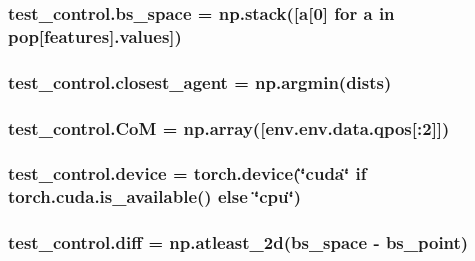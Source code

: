\subsubsection[{\texorpdfstring{bs\+\_\+space}{bs_space}}]{\setlength{\rightskip}{0pt plus 5cm}test\+\_\+control.\+bs\+\_\+space = np.\+stack(\mbox{[}a\mbox{[}0\mbox{]} for a in {\bf pop}\mbox{[}\textquotesingle{}features\textquotesingle{}\mbox{]}.values\mbox{]})}\hypertarget{namespacetest__control_a3ac06242759c7bc7c53eb4fd0911716f}{}\label{namespacetest__control_a3ac06242759c7bc7c53eb4fd0911716f}
\subsubsection[{\texorpdfstring{closest\+\_\+agent}{closest_agent}}]{\setlength{\rightskip}{0pt plus 5cm}test\+\_\+control.\+closest\+\_\+agent = np.\+argmin({\bf dists})}\hypertarget{namespacetest__control_a29317a85baaaf8e8367cc8f7fc680056}{}\label{namespacetest__control_a29317a85baaaf8e8367cc8f7fc680056}
\subsubsection[{\texorpdfstring{CoM}{CoM}}]{\setlength{\rightskip}{0pt plus 5cm}test\+\_\+control.\+CoM = np.\+array(\mbox{[}env.\+env.\+data.\+qpos\mbox{[}\+:2\mbox{]}\mbox{]})}\hypertarget{namespacetest__control_adade4d639cc4b59b066d579a6c1c3ee1}{}\label{namespacetest__control_adade4d639cc4b59b066d579a6c1c3ee1}
\subsubsection[{\texorpdfstring{device}{device}}]{\setlength{\rightskip}{0pt plus 5cm}test\+\_\+control.\+device = torch.\+device(\char`\"{}cuda\char`\"{} if torch.\+cuda.\+is\+\_\+available() else \char`\"{}cpu\char`\"{})}\hypertarget{namespacetest__control_a7585b10e37df81a5eb7b6df2329a1afd}{}\label{namespacetest__control_a7585b10e37df81a5eb7b6df2329a1afd}
\subsubsection[{\texorpdfstring{diff}{diff}}]{\setlength{\rightskip}{0pt plus 5cm}test\+\_\+control.\+diff = np.\+atleast\+\_\+2d({\bf bs\+\_\+space} -\/ {\bf bs\+\_\+point})}\hypertarget{namespacetest__control_ae7ba3d5b0863e8d7241a4d190204dfb3}{}\label{namespacetest__control_ae7ba3d5b0863e8d7241a4d190204dfb3}
